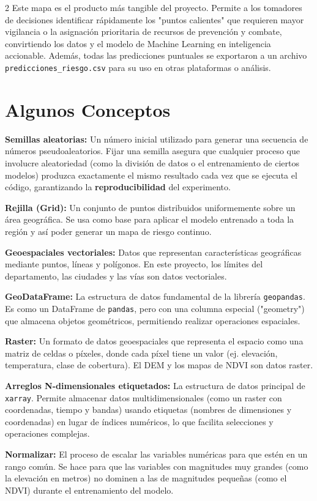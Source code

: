 \documentclass[a4paper,10pt]{article}
\begin{document}
\begin{multicols}{2}
Este mapa es el producto más tangible del proyecto. Permite a los tomadores de decisiones identificar rápidamente los "puntos calientes" que requieren mayor vigilancia o la asignación prioritaria de recursos de prevención y combate, convirtiendo los datos y el modelo de Machine Learning en inteligencia accionable. Además, todas las predicciones puntuales se exportaron a un archivo \texttt{predicciones\_riesgo.csv} para su uso en otras plataformas o análisis.

\section{Algunos Conceptos}
\textbf{Semillas aleatorias:} Un número inicial utilizado para generar una secuencia de números pseudoaleatorios. Fijar una semilla asegura que cualquier proceso que involucre aleatoriedad (como la división de datos o el entrenamiento de ciertos modelos) produzca exactamente el mismo resultado cada vez que se ejecuta el código, garantizando la \textbf{reproducibilidad} del experimento.

\textbf{Rejilla (Grid):} Un conjunto de puntos distribuidos uniformemente sobre un área geográfica. Se usa como base para aplicar el modelo entrenado a toda la región y así poder generar un mapa de riesgo continuo.

\textbf{Geoespaciales vectoriales:} Datos que representan características geográficas mediante puntos, líneas y polígonos. En este proyecto, los límites del departamento, las ciudades y las vías son datos vectoriales.

\textbf{GeoDataFrame:} La estructura de datos fundamental de la librería \texttt{geopandas}. Es como un DataFrame de \texttt{pandas}, pero con una columna especial ("geometry") que almacena objetos geométricos, permitiendo realizar operaciones espaciales.

\textbf{Raster:} Un formato de datos geoespaciales que representa el espacio como una matriz de celdas o píxeles, donde cada píxel tiene un valor (ej. elevación, temperatura, clase de cobertura). El DEM y los mapas de NDVI son datos raster.

\textbf{Arreglos N-dimensionales etiquetados:} La estructura de datos principal de \texttt{xarray}. Permite almacenar datos multidimensionales (como un raster con coordenadas, tiempo y bandas) usando etiquetas (nombres de dimensiones y coordenadas) en lugar de índices numéricos, lo que facilita selecciones y operaciones complejas.

\textbf{Normalizar:} El proceso de escalar las variables numéricas para que estén en un rango común. Se hace para que las variables con magnitudes muy grandes (como la elevación en metros) no dominen a las de magnitudes pequeñas (como el NDVI) durante el entrenamiento del modelo.


\end{multicols}
\end{document}
